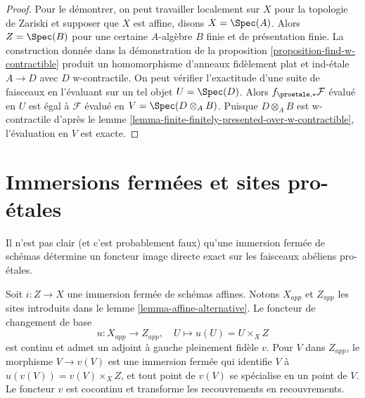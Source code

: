 \begin{proof}
Pour le démontrer, on peut travailler localement sur $X$ pour la topologie de Zariski et supposer que $X$
est affine, disons $X = \Spec(A)$. Alors $Z = \Spec(B)$ pour une certaine
$A$-algèbre $B$ finie et de présentation finie. La construction donnée dans la démonstration de la
proposition \ref{proposition-find-w-contractible}
produit un homomorphisme d'anneaux fidèlement plat et ind-\'etale $A \to D$
avec $D$ w-contractile. On peut vérifier l'exactitude d'une suite de
faisceaux en l'évaluant sur un tel objet $U = \Spec(D)$. Alors
$f_{\proetale, *}\mathcal{F}$
évalué en $U$ est égal à $\mathcal{F}$ évalué en
$V = \Spec(D \otimes_A B)$. Puisque $D \otimes_A B$ est w-contractile
d'après le lemme \ref{lemma-finite-finitely-presented-over-w-contractible},
l'évaluation en $V$ est exacte.
\end{proof}








\section{Immersions fermées et sites pro-\'etales}
\label{section-closed-immersion}

\noindent
Il n'est pas clair (et c'est probablement faux) qu'une immersion fermée de schémas
détermine un foncteur image directe exact sur les faisceaux abéliens pro-\'etales.

\begin{lemma}
\label{lemma-closed-immersion-affines}
Soit $i : Z \to X$ une immersion fermée de schémas affines.
Notons $X_{app}$ et $Z_{app}$ les sites introduits dans le
lemme \ref{lemma-affine-alternative}.
Le foncteur de changement de base
$$
u : X_{app} \to Z_{app},\quad U \longmapsto u(U) = U \times_X Z
$$
est continu et admet un adjoint à gauche pleinement fidèle $v$.
Pour $V$ dans $Z_{app}$, le morphisme $V \to v(V)$ est une immersion fermée
qui identifie $V$ à $u(v(V)) = v(V) \times_X Z$, et tout point de
$v(V)$ se spécialise en un point de $V$.
Le foncteur $v$ est cocontinu et transforme les recouvrements en recouvrements.
\end{lemma}


